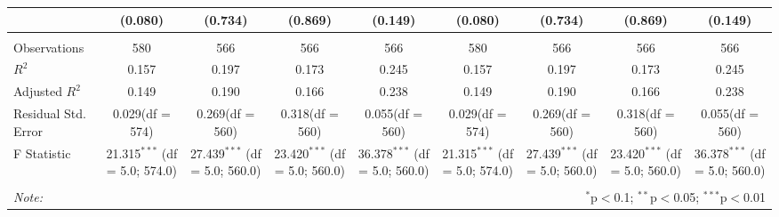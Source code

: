 \begin{table}[!htbp]
\begin{tabular}{@{\extracolsep{5pt}}lcccccccc}
  & (0.080) & (0.734) & (0.869) & (0.149) & (0.080) & (0.734) & (0.869) & (0.149) \\
\hline \\[-1.8ex]
 Observations & 580 & 566 & 566 & 566 & 580 & 566 & 566 & 566 \\
 $R^2$ & 0.157 & 0.197 & 0.173 & 0.245 & 0.157 & 0.197 & 0.173 & 0.245 \\
 Adjusted $R^2$ & 0.149 & 0.190 & 0.166 & 0.238 & 0.149 & 0.190 & 0.166 & 0.238 \\
 Residual Std. Error & 0.029(df = 574) & 0.269(df = 560) & 0.318(df = 560) & 0.055(df = 560) & 0.029(df = 574) & 0.269(df = 560) & 0.318(df = 560) & 0.055(df = 560)  \\
 F Statistic & 21.315$^{***}$ (df = 5.0; 574.0) & 27.439$^{***}$ (df = 5.0; 560.0) & 23.420$^{***}$ (df = 5.0; 560.0) & 36.378$^{***}$ (df = 5.0; 560.0) & 21.315$^{***}$ (df = 5.0; 574.0) & 27.439$^{***}$ (df = 5.0; 560.0) & 23.420$^{***}$ (df = 5.0; 560.0) & 36.378$^{***}$ (df = 5.0; 560.0) \\
\hline
\hline \\[-1.8ex]
\textit{Note:} & \multicolumn{8}{r}{$^{*}$p$<$0.1; $^{**}$p$<$0.05; $^{***}$p$<$0.01} \\
\end{tabular}
\end{table}